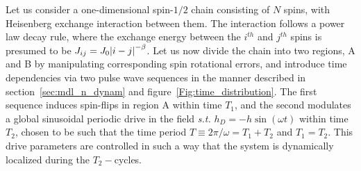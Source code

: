 \documentclass[12pt]{iopart}
\begin{document}
Let us consider a one-dimensional spin-$1/2$ chain consisting of $N$ spins, with Heisenberg exchange interaction between them. The interaction follows a power law decay rule, where the exchange energy between the $i^{th}$ and $j^{th}$ spins is presumed to be  $J_{ij}=J_0\abs{i-j}^{-\beta}$. Let us now  divide the chain into two regions, A and B by manipulating corresponding spin rotational errors, and introduce time dependencies via two pulse wave sequences in the manner described in section~\ref{sec:mdl_n_dynam} and figure~\ref{Fig:time_distribution}. The first sequence  induces spin-flips in region A within time $T_1$, and the second modulates a global sinusoidal periodic drive in the field \textit{s.t.} $h_D = -h\sin(\omega t)$ within time $T_2$, chosen to be such that the time period $T\equiv 2\pi/\omega = T_1 + T_2$ and $T_1 = T_2$. This drive parameters are controlled in such a way that the system is dynamically localized during the $T_2-$cycles.
\end{document}
